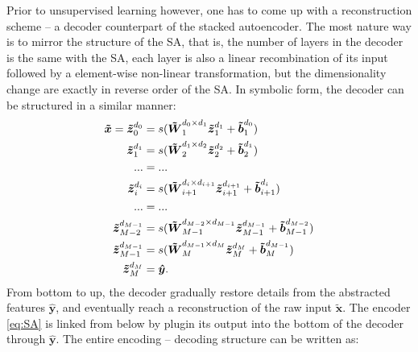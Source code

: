 Prior to unsupervised learning however, one has to come up with a reconstruction scheme -- a decoder counterpart of the stacked autoencoder. The most nature way is to mirror the structure of the SA, that is, the number of layers in the decoder is the same with the SA, each layer is also a linear recombination of its input followed by a element-wise non-linear transformation, but the dimensionality change are exactly in reverse order of the SA. In symbolic form, the decoder can be structured in a similar manner:
\begin{equation} \label{eq:DC}
\begin{split}
  \boldsymbol{\tilde{x}}=
  \boldsymbol{\tilde{z}}_{0  }^{d_{0  }} &= s(\boldsymbol{\tilde{W}}_{1  }^{d_{0  } \times d_{1  }} \boldsymbol{\tilde{z}}_{1  }^{d_{1  }}+  \boldsymbol{\tilde{b}}_{1  }^{d_{0  }}) \\
  \boldsymbol{\tilde{z}}_{1  }^{d_{1  }} &= s(\boldsymbol{\tilde{W}}_{2  }^{d_{1  } \times d_{2  }} \boldsymbol{\tilde{z}}_{2  }^{d_{2  }} + \boldsymbol{\tilde{b}}_{2  }^{d_{1  }}) \\
  ... &= ... \\
  \boldsymbol{\tilde{z}}_{i  }^{d_{i  }} &= s(\boldsymbol{\tilde{W}}_{i+1}^{d_{i  } \times d_{i+1}} \boldsymbol{\tilde{z}}_{i+1}^{d_{i+1}} + \boldsymbol{\tilde{b}}_{i+1}^{d_{i  }}) \\
  ... &= ... \\
  \boldsymbol{\tilde{z}}_{M-2}^{d_{M-1}} &= s(\boldsymbol{\tilde{W}}_{M-1}^{d_{M-2} \times d_{M-1}} \boldsymbol{\tilde{z}}_{M-1}^{d_{M-1}} + \boldsymbol{\tilde{b}}_{M-1}^{d_{M-2}}) \\
  \boldsymbol{\tilde{z}}_{M-1}^{d_{M-1}} &= s(\boldsymbol{\tilde{W}}_{M  }^{d_{M-1} \times d_{M  }} \boldsymbol{\tilde{z}}_{M  }^{d_{M  }} + \boldsymbol{\tilde{b}}_{M  }^{d_{M-1}}) \\
  \boldsymbol{\tilde{z}}_{M  }^{d_{M  }} &= \boldsymbol{\hat{y}} .
\end{split}
\end{equation}
From bottom to up, the decoder gradually restore details from the abstracted features ${\boldsymbol{\hat{y}}}$, and eventually reach a reconstruction of the raw input $\boldsymbol{\tilde{x}}$. The encoder \ref{eq:SA} is linked from below by plugin its output into the bottom of the decoder through ${\boldsymbol{\hat{y}}}$. The entire encoding -- decoding structure can be written as:
